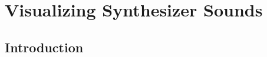 \graphicspath{{./}{./figures/}{./figures/synthexplore/}}

\chapter{Visualizing Synthesizer Sounds}

\section{Introduction}


